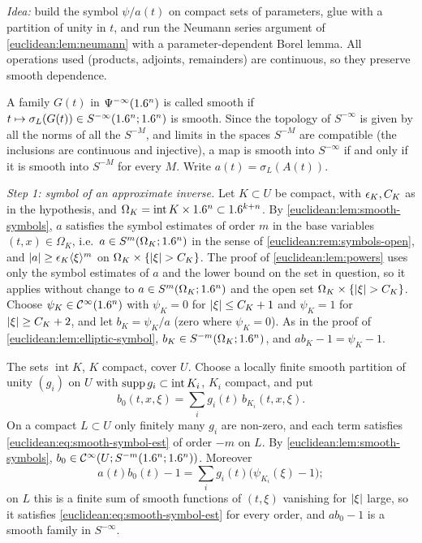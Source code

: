 \subsection*{}

\emph{Idea:} build the symbol $\psi/a(t)$ on compact sets of parameters, glue with a
partition of unity in $t$, and run the Neumann series argument of
\cref{euclidean:lem:neumann} with a parameter-dependent Borel lemma. All operations used
(products, adjoints, remainders) are continuous, so they preserve smooth dependence.

A family $G(t)$ in $\Psi^{-\infty}(1.6^n)$ is called smooth if
$t\mapsto\sigma_L(G(t))\in S^{-\infty}(1.6^n;1.6^n)$ is smooth. Since the topology of
$S^{-\infty}$ is given by all the norms of all the $S^{-M}$, and limits in the spaces
$S^{-M}$ are compatible (the inclusions are continuous and injective), a map is smooth into
$S^{-\infty}$ if and only if it is smooth into $S^{-M}$ for every $M$. Write
$a(t)=\sigma_L(A(t))$.

\emph{Step 1: symbol of an approximate inverse.} Let $K\subset U$ be compact, with
$\epsilon_K,C_K$ as in the hypothesis, and $\Omega_K=\operatorname{int}K\times1.6^n\subset1.6^{k+n}$.
By \cref{euclidean:lem:smooth-symbols}, $a$ satisfies the symbol estimates of order $m$ in
the base variables $(t,x)\in\Omega_K$, i.e.\ $a\in S^m(\Omega_K;1.6^n)$ in the sense of
\cref{euclidean:rem:symbols-open}, and $\lvert a\rvert\ge\epsilon_K\langle \xi\rangle^m$ on
$\Omega_K\times\{\lvert \xi\rvert>C_K\}$. The proof of \cref{euclidean:lem:powers} uses only the
symbol estimates of $a$ and the lower bound on the set in question, so it applies without
change to $a\in S^m(\Omega_K;1.6^n)$ and the open set $\Omega_K\times\{\lvert \xi\rvert>C_K\}$. Choose
$\psi_K\in\mathcal{C}^\infty(1.6^n)$ with $\psi_K=0$ for $\lvert \xi\rvert\le C_K+1$ and $\psi_K=1$ for
$\lvert \xi\rvert\ge C_K+2$, and let $b_K=\psi_K/a$ (zero where $\psi_K=0$). As in the proof of
\cref{euclidean:lem:elliptic-symbol}, $b_K\in S^{-m}(\Omega_K;1.6^n)$, and
$ab_K-1=\psi_K-1$.

The sets $\operatorname{int}K$, $K$ compact, cover $U$. Choose a locally finite smooth
partition of unity $(g_i)$ on $U$ with $\operatorname{supp} g_i\subset\operatorname{int}K_i$, $K_i$
compact, and put
\begin{equation*}
  b_0(t,x,\xi)=\sum_ig_i(t)\,b_{K_i}(t,x,\xi).
\end{equation*}
On a compact $L\subset U$ only finitely many $g_i$ are non-zero, and each term satisfies
\eqref{euclidean:eq:smooth-symbol-est} of order $-m$ on $L$. By
\cref{euclidean:lem:smooth-symbols}, $b_0\in\mathcal{C}^\infty(U;S^{-m}(1.6^n;1.6^n))$. Moreover
\begin{equation*}
  a(t)b_0(t)-1=\sum_ig_i(t)\bigl(\psi_{K_i}(\xi)-1\bigr);
\end{equation*}
on $L$ this is a finite sum of smooth functions of $(t,\xi)$ vanishing for $\lvert \xi\rvert$
large, so it satisfies \eqref{euclidean:eq:smooth-symbol-est} for every order, and
$ab_0-1$ is a smooth family in $S^{-\infty}$.

